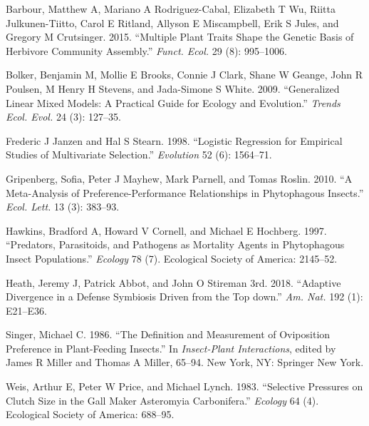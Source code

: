 \documentclass[]{elsarticle} %
\begin{document}
\hypertarget{ref-Barbour2015}{}
Barbour, Matthew A, Mariano A Rodriguez-Cabal, Elizabeth T Wu, Riitta
Julkunen-Tiitto, Carol E Ritland, Allyson E Miscampbell, Erik S Jules,
and Gregory M Crutsinger. 2015. ``Multiple Plant Traits Shape the
Genetic Basis of Herbivore Community Assembly.'' \emph{Funct. Ecol.} 29
(8): 995--1006.

\hypertarget{ref-Bolker2009}{}
Bolker, Benjamin M, Mollie E Brooks, Connie J Clark, Shane W Geange,
John R Poulsen, M Henry H Stevens, and Jada-Simone S White. 2009.
``Generalized Linear Mixed Models: A Practical Guide for Ecology and
Evolution.'' \emph{Trends Ecol. Evol.} 24 (3): 127--35.

\hypertarget{ref-Janzen1998}{}
Frederic J Janzen and Hal S Stearn. 1998. ``Logistic Regression for
Empirical Studies of Multivariate Selection.'' \emph{Evolution} 52 (6):
1564--71.

\hypertarget{ref-Gripenberg2010}{}
Gripenberg, Sofia, Peter J Mayhew, Mark Parnell, and Tomas Roslin. 2010.
``A Meta-Analysis of Preference-Performance Relationships in
Phytophagous Insects.'' \emph{Ecol. Lett.} 13 (3): 383--93.

\hypertarget{ref-Hawkins1997}{}
Hawkins, Bradford A, Howard V Cornell, and Michael E Hochberg. 1997.
``Predators, Parasitoids, and Pathogens as Mortality Agents in
Phytophagous Insect Populations.'' \emph{Ecology} 78 (7). Ecological
Society of America: 2145--52.

\hypertarget{ref-Heath2018}{}
Heath, Jeremy J, Patrick Abbot, and John O Stireman 3rd. 2018.
``Adaptive Divergence in a Defense Symbiosis Driven from the Top down.''
\emph{Am. Nat.} 192 (1): E21--E36.

\hypertarget{ref-Singer1986}{}
Singer, Michael C. 1986. ``The Definition and Measurement of Oviposition
Preference in Plant-Feeding Insects.'' In \emph{Insect-Plant
Interactions}, edited by James R Miller and Thomas A Miller, 65--94. New
York, NY: Springer New York.

\hypertarget{ref-Weis1983}{}
Weis, Arthur E, Peter W Price, and Michael Lynch. 1983. ``Selective
Pressures on Clutch Size in the Gall Maker Asteromyia Carbonifera.''
\emph{Ecology} 64 (4). Ecological Society of America: 688--95.
\end{document}
